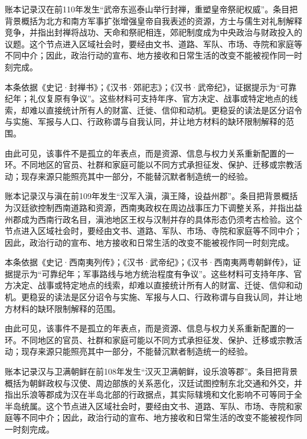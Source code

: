 账本记录汉在前110年发生“武帝东巡泰山举行封禅，重塑皇帝祭祀权威”。条目把背景概括为北方和南方军事扩张增强皇帝自我表述的资源，方士与儒生对礼制解释竞争，并指出封禅将战功、天命和祭祀相连，郊祀制度成为中央政治与财政投入的议题。这个节点进入区域社会时，要经由文书、道路、军队、市场、寺院和家庭等不同中介；因此，政治行动的宣布、地方接收和日常生活的改变不能被视作同一时刻完成。

本条依据《史记·封禅书》；《汉书·郊祀志》；《汉书·武帝纪》，证据提示为“可靠纪年；礼仪复原有争议”。这些材料可支持年序、官方决定、战事或特定地点的线索，却难以直接统计所有人的财富、迁徙、信仰和动机。更稳妥的读法是区分诏令与实施、军报与人口、行政称谓与自我认同，并让地方材料的缺环限制解释的范围。

由此可见，该事件不是孤立的年表点，而是资源、信息与权力关系重新配置的一环。不同地区的官员、社群和家庭可能以不同方式承担征发、保护、迁移或宗教活动；现存来源只能照亮其中一部分，不能替沉默者制造统一的经验。

账本记录汉与滇在前109年发生“汉军入滇，滇王降，设益州郡”。条目把背景概括为汉廷欲控制西南道路和资源，西南夷政权在周边战事压力下调整关系，并指出益州郡成为西南行政名目，滇池地区王权与汉制并存的具体形态仍须考古检验。这个节点进入区域社会时，要经由文书、道路、军队、市场、寺院和家庭等不同中介；因此，政治行动的宣布、地方接收和日常生活的改变不能被视作同一时刻完成。

本条依据《史记·西南夷列传》；《汉书·武帝纪》；《汉书·西南夷两粤朝鲜传》，证据提示为“可靠纪年；军事路线与地方统治程度有争议”。这些材料可支持年序、官方决定、战事或特定地点的线索，却难以直接统计所有人的财富、迁徙、信仰和动机。更稳妥的读法是区分诏令与实施、军报与人口、行政称谓与自我认同，并让地方材料的缺环限制解释的范围。

由此可见，该事件不是孤立的年表点，而是资源、信息与权力关系重新配置的一环。不同地区的官员、社群和家庭可能以不同方式承担征发、保护、迁移或宗教活动；现存来源只能照亮其中一部分，不能替沉默者制造统一的经验。

账本记录汉与卫满朝鲜在前108年发生“汉灭卫满朝鲜，设乐浪等郡”。条目把背景概括为朝鲜政权与汉使、周边部族的关系恶化，汉廷试图控制东北交通和外交，并指出乐浪等郡成为汉在半岛北部的行政据点，其实际辖境和文化影响不可等同于全半岛统属。这个节点进入区域社会时，要经由文书、道路、军队、市场、寺院和家庭等不同中介；因此，政治行动的宣布、地方接收和日常生活的改变不能被视作同一时刻完成。

